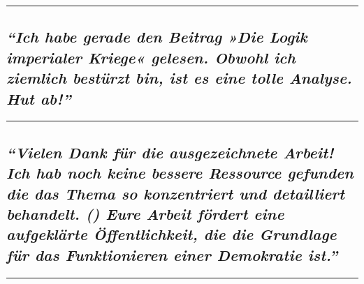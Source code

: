 \begin{center}\rule{0.5\linewidth}{\linethickness}\end{center}

\hypertarget{ich-habe-gerade-den-beitrag-die-logik-imperialer-kriege-gelesen-obwohl-ich-ziemlich-bestuxfcrzt-bin-ist-es-eine-tolle-analyse-hut-ab}{%
\subsection{\texorpdfstring{\emph{``Ich habe gerade den Beitrag »Die
Logik imperialer Kriege« gelesen. Obwohl ich ziemlich bestürzt bin, ist
es eine tolle Analyse. Hut
ab!''}}{``Ich habe gerade den Beitrag »Die Logik imperialer Kriege« gelesen. Obwohl ich ziemlich bestürzt bin, ist es eine tolle Analyse. Hut ab!''}}\label{ich-habe-gerade-den-beitrag-die-logik-imperialer-kriege-gelesen-obwohl-ich-ziemlich-bestuxfcrzt-bin-ist-es-eine-tolle-analyse-hut-ab}}

\begin{center}\rule{0.5\linewidth}{\linethickness}\end{center}

\hypertarget{vielen-dank-fuxfcr-die-ausgezeichnete-arbeit-ich-hab-noch-keine-bessere-ressource-gefunden-die-das-thema-so-konzentriert-und-detailliert-behandelt--eure-arbeit-fuxf6rdert-eine-aufgekluxe4rte-uxf6ffentlichkeit-die-die-grundlage-fuxfcr-das-funktionieren-einer-demokratie-ist}{%
\subsection{\texorpdfstring{\emph{``Vielen Dank für die ausgezeichnete
Arbeit! Ich hab noch keine bessere Ressource gefunden die das Thema so
konzentriert und detailliert behandelt. () Eure Arbeit fördert eine
aufgeklärte Öffentlichkeit, die die Grundlage für das Funktionieren
einer Demokratie
ist.''}}{``Vielen Dank für die ausgezeichnete Arbeit! Ich hab noch keine bessere Ressource gefunden die das Thema so konzentriert und detailliert behandelt. () Eure Arbeit fördert eine aufgeklärte Öffentlichkeit, die die Grundlage für das Funktionieren einer Demokratie ist.''}}\label{vielen-dank-fuxfcr-die-ausgezeichnete-arbeit-ich-hab-noch-keine-bessere-ressource-gefunden-die-das-thema-so-konzentriert-und-detailliert-behandelt--eure-arbeit-fuxf6rdert-eine-aufgekluxe4rte-uxf6ffentlichkeit-die-die-grundlage-fuxfcr-das-funktionieren-einer-demokratie-ist}}

\begin{center}\rule{0.5\linewidth}{\linethickness}\end{center}

